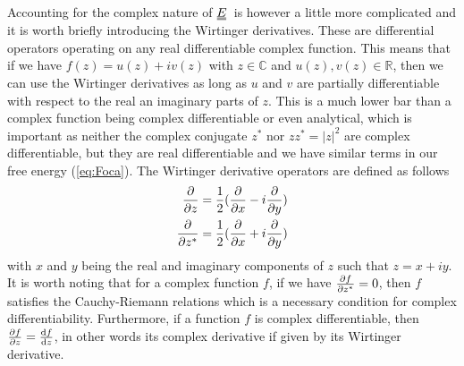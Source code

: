 \documentclass[12pt]{article}
\newcommand{\duf}[2]{\stackunder[0.5pt]{\stackunder[0.8pt]{\stackunder[1pt]{\ensuremath{#1}}{\rule{\widthof{\ensuremath{#2}}*\real{0.9}}{.1ex}}}{\rule{\widthof{\ensuremath{#2}}*\real{0.9}}{.1ex}}}{}}
\newcommand{\du}[1]{\duf{#1}{#1}}
\newcommand{\EE}{\ensuremath{\du{E}}}
\begin{document}
        Accounting for the complex nature of \EE\ is however a little more complicated and it is worth briefly introducing the Wirtinger derivatives\cite{haslingerComplexAnalysisFunctional2017}.
        These are differential operators operating on any real differentiable complex function.
        This means that if we have $f(z) = u(z) + i v(z)$ with $z \in \mathbb{C}$ and $u(z), v(z) \in \mathbb{R}$, then we can use the Wirtinger derivatives as long as $u$ and $v$ are partially differentiable with respect to the real an imaginary parts of $z$.
        This is a much lower bar than a complex function being complex differentiable or even analytical, which is important as neither the complex conjugate $z^*$ nor $z z^* = |z|^2$ are complex differentiable, but they are real differentiable and we have similar terms in our free energy (\cref{eq:Foca}).
        The Wirtinger derivative operators are defined as follows
        \begin{align}
            \pdv{z} &= \frac{1}{2}(\pdv{x} - i\pdv{y}) \\
            \pdv{z^*} &= \frac{1}{2}(\pdv{x} + i\pdv{y})
        \end{align}
        with $x$ and $y$ being the real and imaginary components of $z$ such that $z = x + iy$.
        It is worth noting that for a complex function $f$, if we have $\pdv{f}{z^*}=0$, then $f$ satisfies the Cauchy-Riemann relations which is a necessary condition for complex differentiability.
        Furthermore, if a function $f$ is complex differentiable, then $\pdv{f}{z} = \dv{f}{z}$, in other words its complex derivative if given by its Wirtinger derivative.
\end{document}

